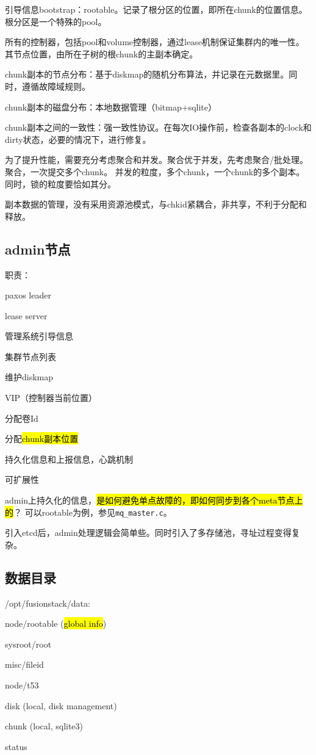 引导信息bootstrap：rootable。记录了根分区的位置，即所在chunk的位置信息。根分区是一个特殊的pool。

所有的控制器，包括pool和volume控制器，通过lease机制保证集群内的唯一性。
其节点位置，由所在子树的根chunk的主副本确定。

chunk副本的节点分布：基于diskmap的随机分布算法，并记录在元数据里。同时，遵循故障域规则。

chunk副本的磁盘分布：本地数据管理（bitmap+sqlite）

chunk副本之间的一致性：强一致性协议。在每次IO操作前，检查各副本的clock和dirty状态，必要的情况下，进行修复。

为了提升性能，需要充分考虑聚合和并发。聚合优于并发，先考虑聚合/批处理。
聚合，一次提交多个chunk。
并发的粒度，多个chunk，一个chunk的多个副本。同时，锁的粒度要恰如其分。

副本数据的管理，没有采用资源池模式，与chkid紧耦合，非共享，不利于分配和释放。

\subsection{admin节点}

职责：
\begin{compactenum}
\item paxos leader
\item lease server
\item 管理系统引导信息
\item 集群节点列表
\item 维护diskmap
\item VIP（控制器当前位置）
\item 分配卷Id
\item 分配\hl{chunk副本位置}
\end{compactenum}

持久化信息和上报信息，心跳机制

可扩展性

admin上持久化的信息，\hl{是如何避免单点故障的，即如何同步到各个meta节点上的}？
可以rootable为例，参见\verb|mq_master.c|。

引入etcd后，admin处理逻辑会简单些。同时引入了多存储池，寻址过程变得复杂。

\subsection{数据目录}

/opt/fusionstack/data:
\begin{itembox}
\item node/rootable (\hl{global info})
    \begin{compactitem}
    \item sysroot/root
    \item misc/fileid
    \item node/t53
    \end{compactitem}
\item disk (local, disk management)
\item chunk (local, sqlite3)
\item status
\end{itembox}

